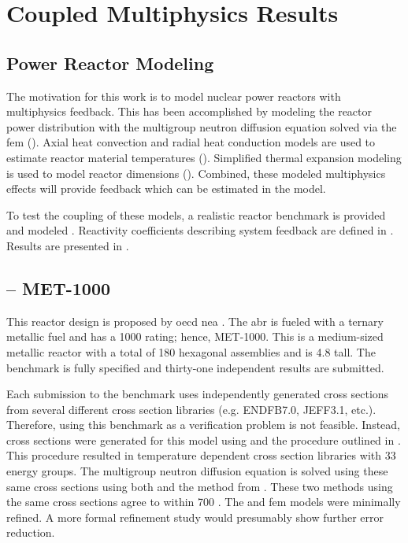 \chapter{Coupled Multiphysics Results}
\label{ch:coupledResults}

\section{Power Reactor Modeling}
\label{sec:power_reactor_modeling}
  The motivation for this work is to model nuclear power reactors with
  multiphysics feedback. This has been accomplished by modeling the reactor 
  power distribution with the multigroup neutron diffusion equation solved via 
  the \gls{fem} (). Axial heat
  convection and radial heat conduction models are used to estimate reactor
  material temperatures ().
  Simplified thermal expansion modeling is used to model reactor dimensions 
  (). Combined, these modeled multiphysics effects 
  will provide feedback which can be estimated in the model. 
  
  To test the coupling of these models, a realistic reactor benchmark is 
  provided and modeled . Reactivity coefficients describing system 
  feedback are defined in . Results are 
  presented in .

\section{ -- MET-1000}
\label{sec:abr}
  This reactor design is proposed by \gls{oecd} \gls{nea} \cite{abr}. The 
  \gls{abr} is fueled with a ternary metallic fuel and has a 1000
   rating; hence, MET-1000. This is a medium-sized metallic reactor 
  with a total of 180 hexagonal assemblies and is 4.8  tall. The 
  benchmark is fully specified and thirty-one independent results are submitted. 
  
  Each submission to the benchmark uses independently generated cross sections 
  from several different cross section libraries (e.g. ENDFB7.0, JEFF3.1, etc.). 
  Therefore, using this benchmark as a verification problem is not feasible.
  Instead, cross sections were generated for this model using \mcc and the
  procedure outlined in . This procedure 
  resulted in temperature dependent cross section libraries with 33 energy 
  groups. The multigroup neutron diffusion equation is solved using these same
  cross sections using both \dif and the method from 
  . These two methods using the same cross sections 
  agree to within 700 . The \dif and \gls{fem} models were minimally 
  refined. A more formal refinement study would presumably show further error 
  reduction. 
  
